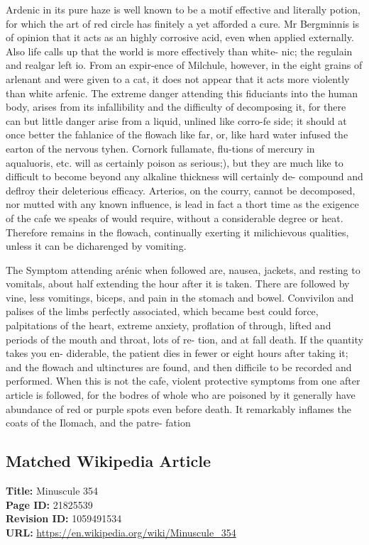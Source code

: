 \documentclass{article}
\begin{document}
Ardenic in its pure haze is well known to be a motif effective and literally potion, for which the art of red circle has finitely a yet afforded a cure. Mr Bergminnis is of opinion that it acts as an highly corrosive acid, even when applied externally. Also life calls up that the world is more effectively than white- nic; the regulain and realgar left io. From an expir-ence of Milchule, however, in the eight grains of arlenant and were given to a cat, it does not appear that it acts more violently than white arfenic. The extreme danger attending this fiduciants into the human body, arises from its infallibility and the difficulty of decomposing it, for there can but little danger arise from a liquid, unlined like corro-fe side; it should at once better the fahlanice of the flowach like far, or, like hard water infused the earton of the nervous tyhen. Cornork fullamate, flu-tions of mercury in aqualuoris, etc. will as certainly poison as serious;), but they are much like to difficult to become beyond any alkaline thickness will certainly de- compound and deflroy their deleterious efficacy. Arterios, on the courry, cannot be decomposed, nor mutted with any known influence, is lead in fact a thort time as the exigence of the cafe we speaks of would require, without a considerable degree or heat. Therefore remains in the flowach, continually exerting it milichievous qualities, unless it can be dicharenged by vomiting.

The Symptom attending arénic when followed are, nausea, jackets, and resting to vomitals, about half extending the hour after it is taken. There are followed by vine, less vomitings, biceps, and pain in the stomach and bowel. Convivilon and palises of the limbs perfectly associated, which became best could force, palpitations of the heart, extreme anxiety, proflation of through, lifted and periods of the mouth and throat, lots of re- tion, and at fall death. If the quantity takes you en- diderable, the patient dies in fewer or eight hours after taking it; and the flowach and ultinctures are found, and then difficile to be recorded and performed. When this is not the cafe, violent protective symptoms from one after article is followed, for the bodres of whole who are poisoned by it generally have abundance of red or purple spots even before death. It remarkably inflames the coats of the Ilomach, and the patre- fation

\subsection*{Matched Wikipedia Article}
\textbf{Title:} Minuscule 354 \\
\textbf{Page ID:} 21825539 \\
\textbf{Revision ID:} 1059491534 \\
\textbf{URL:} \url{https://en.wikipedia.org/wiki/Minuscule\_354}
\end{document}
